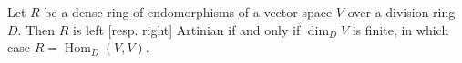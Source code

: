 Let $R$ be a dense ring of endomorphisms of a vector space $V$ over a division ring $D$. Then $R$ is left [resp. right] Artinian if and only if $\dim_D V$ is finite, in which case $R = \operatorname{Hom}_D(V,V)$.

